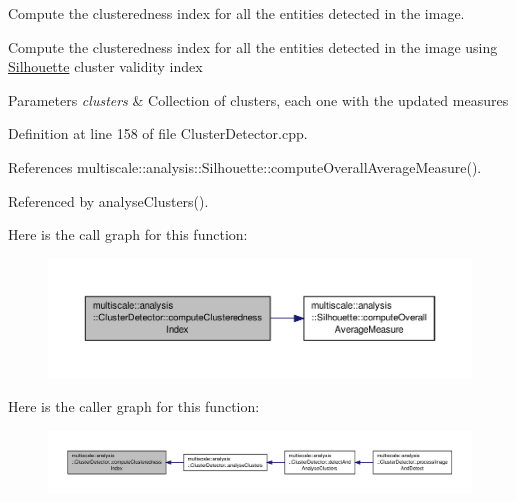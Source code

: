 Compute the clusteredness index for all the entities detected in the image. 

Compute the clusteredness index for all the entities detected in the image using \hyperlink{classmultiscale_1_1analysis_1_1Silhouette}{Silhouette} cluster validity index


\begin{DoxyParams}{Parameters}
{\em clusters} & Collection of clusters, each one with the updated measures \\
\hline
\end{DoxyParams}


Definition at line 158 of file Cluster\-Detector.\-cpp.



References multiscale\-::analysis\-::\-Silhouette\-::compute\-Overall\-Average\-Measure().



Referenced by analyse\-Clusters().



Here is the call graph for this function\-:\nopagebreak
\begin{figure}[H]
\begin{center}
\leavevmode
\includegraphics[width=350pt]{classmultiscale_1_1analysis_1_1ClusterDetector_aaa7937daf9872614e09b23cb4f6e5aa8_cgraph}
\end{center}
\end{figure}




Here is the caller graph for this function\-:\nopagebreak
\begin{figure}[H]
\begin{center}
\leavevmode
\includegraphics[width=350pt]{classmultiscale_1_1analysis_1_1ClusterDetector_aaa7937daf9872614e09b23cb4f6e5aa8_icgraph}
\end{center}
\end{figure}


